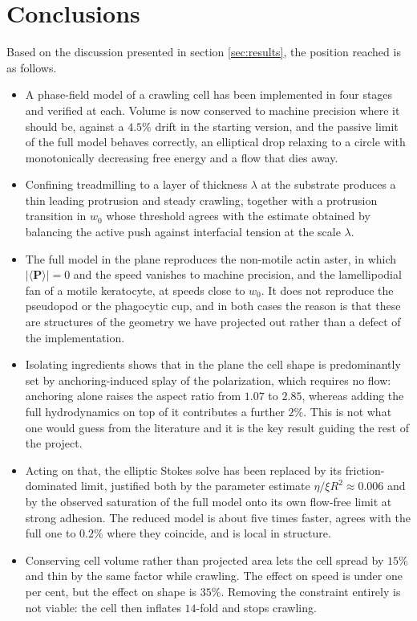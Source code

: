 \documentclass[11pt]{article}
\begin{document}
\section{Conclusions}
\label{sec:Conclusion}
Based on the discussion presented in section \ref{sec:results}, the position
reached is as follows.

\begin{itemize}
\item A phase-field model of a crawling cell has been implemented in four stages
and verified at each. Volume is now conserved to machine precision where it
should be, against a $4.5\%$ drift in the starting version, and the passive limit
of the full model behaves correctly, an elliptical drop relaxing to a circle with
monotonically decreasing free energy and a flow that dies away.

\item Confining treadmilling to a layer of thickness $\lambda$ at the substrate
produces a thin leading protrusion and steady crawling, together with a
protrusion transition in $w_{0}$ whose threshold agrees with the estimate obtained
by balancing the active push against interfacial tension at the scale $\lambda$.

\item The full model in the plane reproduces the non-motile actin aster, in which
$|\langle\mathbf{P}\rangle|=0$ and the speed vanishes to machine precision, and
the lamellipodial fan of a motile keratocyte, at speeds close to $w_{0}$. It does
not reproduce the pseudopod or the phagocytic cup, and in both cases the reason is
that these are structures of the geometry we have projected out rather than a
defect of the implementation.

\item Isolating ingredients shows that in the plane the cell shape is
predominantly set by anchoring-induced splay of the polarization, which requires
no flow: anchoring alone raises the aspect ratio from $1.07$ to $2.85$, whereas
adding the full hydrodynamics on top of it contributes a further $2\%$. This is
not what one would guess from the literature and it is the key result guiding the
rest of the project.

\item Acting on that, the elliptic Stokes solve has been replaced by its
friction-dominated limit, justified both by the parameter estimate
$\eta/\xi R^{2}\approx0.006$ and by the observed saturation of the full model onto
its own flow-free limit at strong adhesion. The reduced model is about five times
faster, agrees with the full one to $0.2\%$ where they coincide, and is local in
structure.

\item Conserving cell volume rather than projected area lets the cell spread by
$15\%$ and thin by the same factor while crawling. The effect on speed is under
one per cent, but the effect on shape is $35\%$. Removing the constraint entirely
is not viable: the cell then inflates $14$-fold and stops crawling.
\end{itemize}
\end{document}
